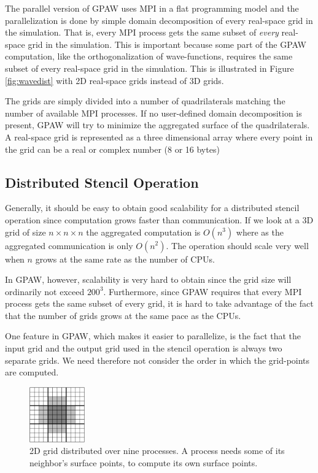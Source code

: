 \documentclass[preprint,3p,times,twocolumn]{elsarticle}
\begin{document}
The parallel version of GPAW uses MPI in a flat programming model and the parallelization is done by simple domain decomposition of every real-space grid in the simulation. That is, every MPI process gets the same subset of \emph{every} real-space grid in the simulation. This is important because some part of the GPAW computation, like the orthogonalization of wave-functions, requires the same subset of every real-space grid in the simulation. This is illustrated in Figure \ref{fig:wavedist} with 2D real-space grids instead of 3D grids.

The grids are simply divided into a number of quadrilaterals matching the number of available MPI processes. If no user-defined domain decomposition is present, GPAW will try to minimize the aggregated surface of the quadrilaterals. A real-space grid is represented as a three dimensional array where every point in the grid can be a real or complex number (8 or 16 bytes)

\subsection{Distributed Stencil Operation}
Generally, it should be easy to obtain good scalability for a distributed stencil operation since computation grows faster than communication. If we look at a 3D grid of size $n \times n \times n$ the aggregated computation is $O\left(n^3\right)$ where as the aggregated communication is only $O\left(n^2\right)$. The operation should scale very well when $n$ grows at the same rate as the number of CPUs.

In GPAW, however, scalability is very hard to obtain since the grid size will ordinarily not exceed $200^3$. Furthermore, since GPAW requires that every MPI process gets the same subset of every grid, it is hard to take advantage of the fact that the number of grids grows at the same pace as the CPUs.

One feature in GPAW, which makes it easier to parallelize, is the fact that the input grid and the output grid used in the stencil operation is always two separate grids. We need therefore not consider the order in which the grid-points are computed.

\begin{figure}
 \centering
 \includegraphics[width=90px]{gfx/diststencil}
 \caption{2D grid distributed over nine processes. A process needs some of its neighbor's surface points, to compute its own surface points.}
 \label{fig:diststencil}
\end{figure}
\end{document}
